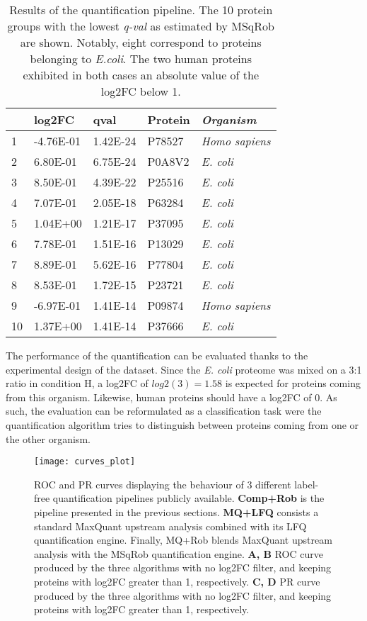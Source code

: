 \begin{table}[ht]
\centering
\begin{tabular}{llll>{\itshape}l}
  \toprule
 & \ac{log2FC} & qval & Protein & Organism \\ 
  \midrule
1 & -4.76E-01 & 1.42E-24 & P78527 & Homo sapiens \\ 
   \rowcolor[gray]{0.95}2 & 6.80E-01 & 6.75E-24 & P0A8V2 & E. coli \\ 
  3 & 8.50E-01 & 4.39E-22 & P25516 & E. coli \\ 
   \rowcolor[gray]{0.95}4 & 7.07E-01 & 2.05E-18 & P63284 & E. coli \\ 
  5 & 1.04E+00 & 1.21E-17 & P37095 & E. coli \\ 
   \rowcolor[gray]{0.95}6 & 7.78E-01 & 1.51E-16 & P13029 & E. coli \\ 
  7 & 8.89E-01 & 5.62E-16 & P77804 & E. coli \\ 
   \rowcolor[gray]{0.95}8 & 8.53E-01 & 1.72E-15 & P23721 & E. coli \\ 
  9 & -6.97E-01 & 1.41E-14 & P09874 & Homo sapiens \\ 
   \rowcolor[gray]{0.95}10 & 1.37E+00 & 1.41E-14 & P37666 & E. coli \\ 
   \bottomrule
\end{tabular}
\caption{Results of the quantification pipeline. The 10 protein groups with the lowest \textit{q-val}  as estimated by MSqRob are shown. Notably, eight correspond to proteins belonging to \textit{E.coli}. The two human proteins exhibited in both cases an absolute value of the \ac{log2FC} below 1.}
\label{tab:quantification_table}
\end{table}

The performance of the quantification can be evaluated thanks to the experimental design of the dataset. Since the \textit{E. coli} proteome was mixed on a 3:1 ratio in condition H, a \ac{log2FC} of $log2(3)=1.58$ is expected for proteins coming from this organism. Likewise, human proteins should have a \ac{log2FC} of 0. As such, the evaluation can be reformulated as a classification task were the quantification algorithm tries to distinguish between proteins coming from one or the other organism.


\begin{figure}[H]
\centering
\texttt{[image: curves\_plot]}
\caption{ROC and PR curves displaying the behaviour of 3 different label-free quantification pipelines publicly available. \textbf{Comp+Rob} is the pipeline presented in the previous sections. \textbf{MQ+LFQ} consists a standard MaxQuant upstream analysis combined with its LFQ quantification engine. Finally, MQ+Rob blends MaxQuant upstream analysis with the MSqRob quantification engine. \textbf{A, B} ROC curve produced by the three algorithms with no \ac{log2FC} filter, and keeping proteins with \ac{log2FC} greater than 1, respectively. \textbf{C, D} PR curve produced by the three algorithms with no \ac{log2FC} filter, and keeping proteins with \ac{log2FC} greater than 1, respectively.}
\label{fig:roc_curves}
\end{figure}


